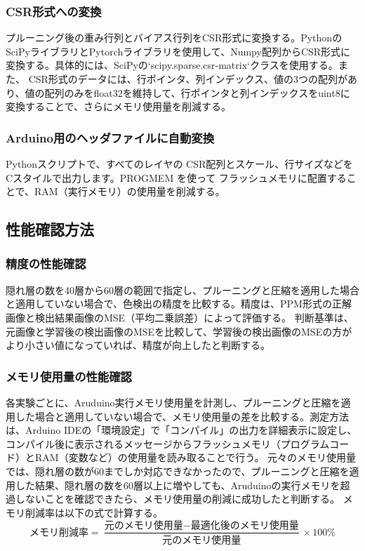 \documentclass[uplatex,dvipdfmx]{jsarticle}
\begin{document}
\subsubsection{CSR形式への変換}
プルーニング後の重み行列とバイアス行列をCSR形式に変換する。PythonのSciPyライブラリとPytorchライブラリを使用して、Numpy配列からCSR形式に変換する。具体的には、SciPyの`scipy.sparse.csr-matrix`クラスを使用する。また、
CSR形式のデータには、行ポインタ、列インデックス、値の3つの配列があり、値の配列のみをfloat32を維持して、行ポインタと列インデックスをuint8に変換することで、さらにメモリ使用量を削減する。
\subsubsection{Arduino用のヘッダファイルに自動変換}
Pythonスクリプトで、すべてのレイヤの CSR配列とスケール、行サイズなどをCスタイルで出力します。PROGMEM を使って フラッシュメモリに配置することで、RAM（実行メモリ）の使用量を削減する。
\subsection{性能確認方法}
\subsubsection{精度の性能確認}
隠れ層の数を40層から60層の範囲で指定し、プルーニングと圧縮を適用した場合と適用していない場合で、色検出の精度を比較する。精度は、PPM形式の正解画像と検出結果画像のMSE（平均二乗誤差）によって評価する。
判断基準は、元画像と学習後の検出画像のMSEを比較して、学習後の検出画像のMSEの方がより小さい値になっていれば、精度が向上したと判断する。
\subsubsection{メモリ使用量の性能確認}
各実験ごとに、Aruduino実行メモリ使用量を計測し、プルーニングと圧縮を適用した場合と適用していない場合で、メモリ使用量の差を比較する。測定方法は、Arduino IDEの「環境設定」で「コンパイル」の出力を詳細表示に設定し、コンパイル後に表示されるメッセージからフラッシュメモリ（プログラムコード）とRAM（変数など）の使用量を読み取ることで行う。
元々のメモリ使用量では、隠れ層の数が60までしか対応できなかったので、プルーニングと圧縮を適用した結果、隠れ層の数を60層以上に増やしても、Aruduinoの実行メモリを超過しないことを確認できたら、メモリ使用量の削減に成功したと判断する。
メモリ削減率は以下の式で計算する。\\
\[
\text{メモリ削減率} = \frac{\text{元のメモリ使用量} - \text{最適化後のメモリ使用量}}{\text{元のメモリ使用量}} \times 100\%
\]
\end{document}
